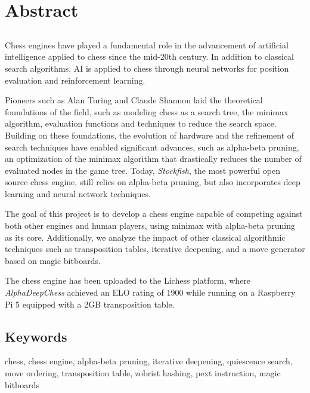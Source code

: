 \chapter*{Abstract}

\section*{\tituloPortadaEngVal}

Chess engines have played a fundamental role in the advancement of artificial intelligence applied to chess since the mid-20th century. In addition to classical search algorithms, AI is applied to chess through neural networks for position evaluation and reinforcement learning.

\vspace{1em}

\noindent Pioneers such as Alan Turing and Claude Shannon laid the theoretical foundations of the field, such as modeling chess as a search tree, the minimax algorithm, evaluation functions and techniques to reduce the search space. Building on these foundations, the evolution of hardware and the refinement of search techniques have enabled significant advances, such as alpha-beta pruning, an optimization of the minimax algorithm that drastically reduces the number of evaluated nodes in the game tree. Today, \textit{Stockfish}, the most powerful open source chess engine, still relies on alpha-beta pruning, but also incorporates deep learning and neural network techniques.

\vspace{1em}

\noindent The goal of this project is to develop a chess engine capable of competing against both other engines and human players, using minimax with alpha-beta pruning as its core. Additionally, we analyze the impact of other classical algorithmic techniques such as transposition tables, iterative deepening, and a move generator based on magic bitboards.

\vspace{1em}

The chess engine has been uploaded to the Lichess platform, where \textit{AlphaDeepChess} achieved an ELO rating of 1900 while running on a Raspberry Pi 5 equipped with a 2GB transposition table.

\section*{Keywords}

\noindent chess, chess engine, alpha-beta pruning, iterative deepening, quiescence search, move ordering, transposition table, zobrist hashing, pext instruction, magic bitboards
